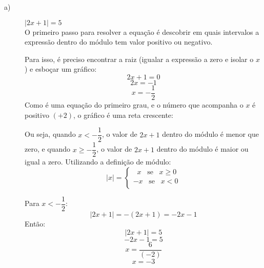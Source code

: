             \begin{description}
                \item[a)] $|2x+1|=5$\\
			O primeiro passo para resolver a equação é descobrir em quais intervalos a expressão dentro do módulo tem valor positivo ou negativo.
            
                Para isso, é preciso encontrar a raiz (igualar a expressão a zero e isolar o $x$) e esboçar um gráfico:
                \[ 2x+1=0 \]
                \[ 2x=-1 \]
                \[ x= -\dfrac{1}{2} \]
                Como é uma equação do primeiro grau, e o número que acompanha o $x$ é positivo $(+2)$, o gráfico é uma reta crescente:\\
                \begin{center}
                \end{center}
                
                Ou seja, quando $x < -\dfrac{1}{2}$, o valor de $2x + 1$ dentro do módulo é menor que zero, e quando $x \ge -\dfrac{1}{2}$, o valor de $2x + 1$ dentro do módulo é maior ou igual a zero. Utilizando a definição de módulo:\\
                \[ 
	        |x| = \left\{  
	           \begin{array}{c}
		          \;\; x \;\;\; \text{se} \;\;\; x \ge 0\\
		          -x \;\;\; \text{se} \;\;\; x < 0\\
	           \end{array} 
	           \right.
	        \]
         
                Para $x<-\dfrac{1}{2}$:
                \[
                |2x+1|= -(2x+1) =-2x-1
                \]
                Então:
                \[ |2x+1|= 5 \]
                \[-2x-1=5 \]
                \[x=\dfrac{6}{(-2)}\]
                \[x=-3\] 
                

\end{description}
